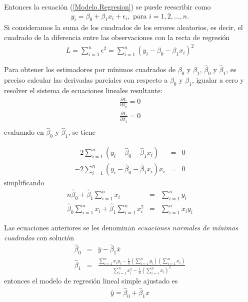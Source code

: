 Entonces la ecuaci\'on (\ref{Modelo.Regresion}) se puede reescribir como
\begin{eqnarray}\label{Modelo.Regresion.dos}
y_{i}=\beta_{0}+\beta_{1}x_{i}+\epsilon_{i},\textrm{ para }i=1,2,\ldots,n.
\end{eqnarray}
Si consideramos la suma de los cuadrados de los errores aleatorios, es decir, el cuadrado de la diferencia entre las observaciones con la recta de regresi\'on 
\begin{eqnarray}
L=\sum_{i=1}^{n}\epsilon^{2}=\sum_{i=1}^{n}\left(y_{i}-\beta_{0}-\beta_{1}x_{i}\right)^{2}
\end{eqnarray}





Para obtener los estimadores por m\'inimos cuadrados de $\beta_{0}$ y $\beta_{1}$, $\hat{\beta}_{0}$ y $\hat{\beta}_{1}$, es preciso calcular las derivadas parciales con respecto a $\beta_{0}$ y $\beta_{1}$,  igualar a cero y  resolver el sistema de ecuaciones lineales resultante:
\begin{eqnarray*}
\frac{\partial L}{\partial \beta_{0}}=0\\
\frac{\partial L}{\partial \beta_{1}}=0\\
\end{eqnarray*}
evaluando en $\hat{\beta}_{0}$ y $\hat{\beta}_{1}$, se tiene

\begin{eqnarray*}
-2\sum_{i=1}^{n}\left(y_{i}-\hat{\beta}_{0}-\hat{\beta}_{1}x_{i}\right)&=&0\\
-2\sum_{i=1}^{n}\left(y_{i}-\hat{\beta}_{0}-\hat{\beta}_{1}x_{i}\right)x_{i}&=&0
\end{eqnarray*}
simplificando
\begin{eqnarray*}
n\hat{\beta}_{0}+\hat{\beta}_{1}\sum_{i=1}^{n}x_{i}&=&\sum_{i=1}^{n}y_{i}\\
\hat{\beta}_{0}\sum_{i=1}^{n}x_{i}+\hat{\beta}_{1}\sum_{i=1}^{n}x_{i}^{2}&=&\sum_{i=1}^{n}x_{i}y_{i}
\end{eqnarray*}





Las ecuaciones anteriores se les denominan \textit{ecuaciones normales de m\'inimos cuadrados} con soluci\'on
\begin{eqnarray}
\hat{\beta}_{0}&=&\overline{y}-\hat{\beta}_{1}\overline{x}\\
\hat{\beta}_{1}&=&\frac{\sum_{i=1}^{n}x_{i}y_{i}-\frac{1}{n}\left(\sum_{i=1}^{n}y_{i}\right)\left(\sum_{i=1}^{n}x_{i}\right)}{\sum_{i=1}^{n}x_{i}^{2}-\frac{1}{n}\left(\sum_{i=1}^{n}x_{i}\right)^{2}}
\end{eqnarray}
entonces el modelo de regresi\'on lineal simple ajustado es
\begin{eqnarray}
\hat{y}=\hat{\beta}_{0}+\hat{\beta}_{1}x
\end{eqnarray}

